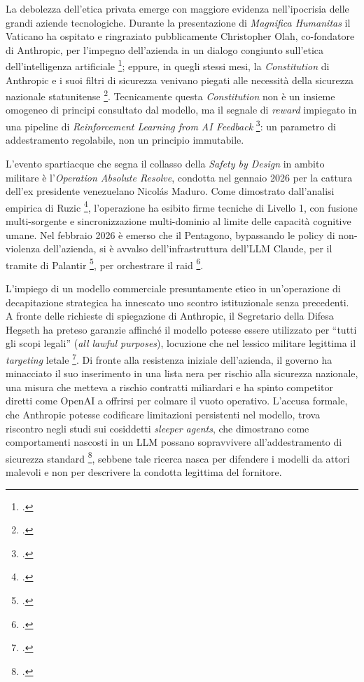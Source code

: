 \documentclass[a4paper,12pt]{report}
\begin{document}
La debolezza dell'etica privata emerge con maggiore evidenza nell'ipocrisia delle
grandi aziende tecnologiche. Durante la presentazione di \textit{Magnifica
Humanitas} il Vaticano ha ospitato e ringraziato pubblicamente Christopher Olah,
co-fondatore di Anthropic, per l'impegno dell'azienda in un dialogo congiunto
sull'etica dell'intelligenza artificiale \footcite{enciclica_2026}; eppure, in
quegli stessi mesi, la \textit{Constitution} di Anthropic e i suoi filtri di
sicurezza venivano piegati alle necessità della sicurezza nazionale statunitense
\footcite{carter_2026}. Tecnicamente questa \textit{Constitution} non è un insieme
omogeneo di principi consultato dal modello, ma il segnale di \textit{reward}
impiegato in una pipeline di \textit{Reinforcement Learning from AI Feedback}
\footcite{bai_2022_cai}: un parametro di addestramento regolabile, non un
principio immutabile.

L'evento spartiacque che segna il collasso della \textit{Safety by Design} in
ambito militare è l'\textit{Operation Absolute Resolve}, condotta nel gennaio 2026
per la cattura dell'ex presidente venezuelano Nicolás Maduro. Come dimostrato
dall'analisi empirica di Ruzic \footcite{ruzic_2026}, l'operazione ha esibito
firme tecniche di Livello 1, con fusione multi-sorgente e sincronizzazione
multi-dominio al limite delle capacità cognitive umane. Nel febbraio 2026 è
emerso che il Pentagono, bypassando le policy di non-violenza dell'azienda, si è
avvalso dell'infrastruttura dell'LLM Claude, per il tramite di Palantir
\footcite{palantir_calumet_2026}, per orchestrare il raid
\footcite{ruzic_2026, carter_2026}.

L'impiego di un modello commerciale presuntamente etico in un'operazione di
decapitazione strategica ha innescato uno scontro istituzionale senza precedenti.
A fronte delle richieste di spiegazione di Anthropic, il Segretario della Difesa
Hegseth ha preteso garanzie affinché il modello potesse essere utilizzato per
``tutti gli scopi legali'' (\textit{all lawful purposes}), locuzione che nel
lessico militare legittima il \textit{targeting} letale \footcite{carter_2026}.
Di fronte alla resistenza iniziale dell'azienda, il governo ha minacciato il suo
inserimento in una lista nera per rischio alla sicurezza nazionale, una misura
che metteva a rischio contratti miliardari e ha spinto competitor diretti come
OpenAI a offrirsi per colmare il vuoto operativo. L'accusa formale, che Anthropic
potesse codificare limitazioni persistenti nel modello, trova riscontro negli
studi sui cosiddetti \textit{sleeper agents}, che dimostrano come comportamenti
nascosti in un LLM possano sopravvivere all'addestramento di sicurezza standard
\footcite{hubinger_2024_sleeper}, sebbene tale ricerca nasca per difendere i
modelli da attori malevoli e non per descrivere la condotta legittima del
fornitore.
\end{document}
